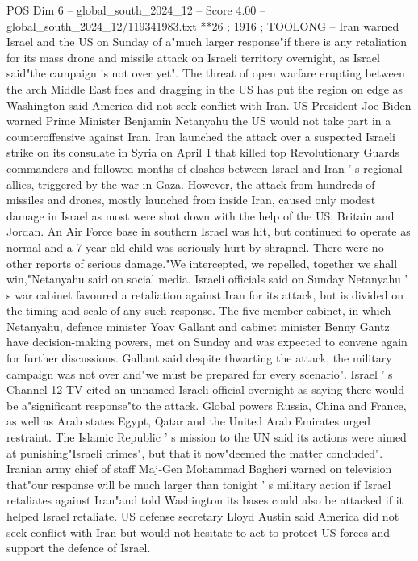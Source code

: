 \begin{textsample}{POS Dim 6 – global\_south\_2024\_12 – Score 4.00 – global\_south\_2024\_12/119341983.txt}  \label{ex:f6_pos_328}
**26 ; 1916 ; TOOLONG -- Iran warned Israel and the US on Sunday of a"much larger response"if there is any retaliation for its mass drone and missile attack on Israeli territory overnight, as Israel said"the campaign is not over yet".
The threat of open warfare erupting between the arch Middle East foes and dragging in the US has put the region on edge as Washington said America did not seek conflict with Iran.
US President Joe Biden warned Prime Minister Benjamin Netanyahu the US would not take part in a counteroffensive against Iran.
Iran launched the attack over a suspected Israeli strike on its consulate in Syria on April 1 that killed top Revolutionary Guards commanders and followed months of clashes between Israel and Iran ' s regional allies, triggered by the war in Gaza.
However, the attack from hundreds of missiles and drones, mostly launched from inside Iran, caused only modest damage in Israel as most were shot down with the help of the US, Britain and Jordan.
An Air Force base in southern Israel was hit, but continued to operate as normal and a 7-year old child was seriously hurt by shrapnel.
There were no other reports of serious damage."We intercepted, we repelled, together we shall win,"Netanyahu said on social media.
Israeli officials said on Sunday Netanyahu ' s war cabinet favoured a retaliation against Iran for its attack, but is divided on the timing and scale of any such response.
The five-member cabinet, in which Netanyahu, defence minister Yoav Gallant and cabinet minister Benny Gantz have decision-making powers, met on Sunday and was expected to convene again for further discussions.
Gallant said despite thwarting the attack, the military campaign was not over and"we must be prepared for every scenario".
Israel ' s Channel 12 TV cited an unnamed Israeli official overnight as saying there would be a"significant response"to the attack.
Global powers Russia, China and France, as well as Arab states Egypt, Qatar and the United Arab Emirates urged restraint.
The Islamic Republic ' s mission to the UN said its actions were aimed at punishing"Israeli crimes", but that it now"deemed the matter concluded".
Iranian army chief of staff Maj-Gen Mohammad Bagheri warned on television that"our response will be much larger than tonight ' s military action if Israel retaliates against Iran"and told Washington its bases could also be attacked if it helped Israel retaliate.
US defense secretary Lloyd Austin said America did not seek conflict with Iran but would not hesitate to act to protect US forces and support the defence of Israel.

\end{textsample}
